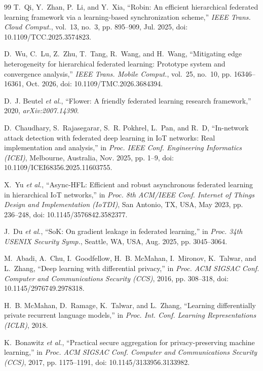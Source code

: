 \documentclass[conference]{IEEEtran}
\begin{document}
\begin{thebibliography}{99}
T.~Qi, Y.~Zhan, P.~Li, and Y.~Xia, ``Robin: An efficient hierarchical federated learning framework via a learning-based synchronization scheme,'' \textit{IEEE Trans. Cloud Comput.}, vol.~13, no.~3, pp. 895--909, Jul. 2025, doi: 10.1109/TCC.2025.3574823.

D.~Wu, C.~Lu, Z.~Zhu, T.~Tang, R.~Wang, and H.~Wang, ``Mitigating edge heterogeneity for hierarchical federated learning: Prototype system and convergence analysis,'' \textit{IEEE Trans. Mobile Comput.}, vol.~25, no.~10, pp. 16346--16361, Oct. 2026, doi: 10.1109/TMC.2026.3684394.

D.~J. Beutel \textit{et al.}, ``Flower: A friendly federated learning research framework,'' 2020, \textit{arXiv:2007.14390}.

D.~Chaudhary, S.~Rajasegarar, S.~R. Pokhrel, L.~Pan, and R.~D, ``In-network attack detection with federated deep learning in IoT networks: Real implementation and analysis,'' in \textit{Proc. IEEE Conf. Engineering Informatics (ICEI)}, Melbourne, Australia, Nov. 2025, pp. 1--9, doi: 10.1109/ICEI68356.2025.11603755.

X.~Yu \textit{et al.}, ``Async-HFL: Efficient and robust asynchronous federated learning in hierarchical IoT networks,'' in \textit{Proc. 8th ACM/IEEE Conf. Internet of Things Design and Implementation (IoTDI)}, San Antonio, TX, USA, May 2023, pp. 236--248, doi: 10.1145/3576842.3582377.

J.~Du \textit{et al.}, ``SoK: On gradient leakage in federated learning,'' in \textit{Proc. 34th USENIX Security Symp.}, Seattle, WA, USA, Aug. 2025, pp. 3045--3064.

M.~Abadi, A.~Chu, I.~Goodfellow, H.~B. McMahan, I.~Mironov, K.~Talwar, and L.~Zhang, ``Deep learning with differential privacy,'' in \textit{Proc. ACM SIGSAC Conf. Computer and Communications Security (CCS)}, 2016, pp. 308--318, doi: 10.1145/2976749.2978318.

H.~B. McMahan, D.~Ramage, K.~Talwar, and L.~Zhang, ``Learning differentially private recurrent language models,'' in \textit{Proc. Int. Conf. Learning Representations (ICLR)}, 2018.

K.~Bonawitz \textit{et al.}, ``Practical secure aggregation for privacy-preserving machine learning,'' in \textit{Proc. ACM SIGSAC Conf. Computer and Communications Security (CCS)}, 2017, pp. 1175--1191, doi: 10.1145/3133956.3133982.


\end{thebibliography}
\end{document}
